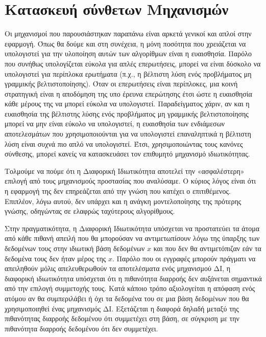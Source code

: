 
\section{Κατασκευή σύνθετων Μηχανισμών}

Οι μηχανισμοί που παρουσιάστηκαν παραπάνω είναι αρκετά γενικοί και απλοί στην εφαρμογή. Όπως θα δούμε και στη συνέχεια, η μόνη ποσότητα που χρειάζεται να υπολογιστεί για την υλοποίηση αυτών των αλγορίθμων είναι η ευαισθησία. Παρόλο που συνήθως υπολογίζεται εύκολα για απλές επερωτήσεις, μπορεί να είναι δύσκολο να υπολογιστεί για περίπλοκα ερωτήματα (π.χ., η βέλτιστη λύση ενός προβλήματος μη γραμμικής βελτιστοποίησης). Όταν οι επερωτήσεις είναι περίπλοκες, μια κοινή στρατηγική είναι η αποδόμηση της υπο έρευνα επερώτησης έτσι ώστε η ευαισθησία κάθε μέρους της να μπορεί εύκολα να υπολογιστεί.
Παραδείγματος χάριν, αν και η ευαισθησία της βέλτιστης λύσης ενός προβλήματος μη γραμμικής βελτιστοποίησης μπορεί να μην είναι εύκολο να υπολογιστεί, η ευαισθησία των ενδιάμεσων αποτελεσμάτων που χρησιμοποιούνται για να υπολογιστεί επαναληπτικά η βέλτιστη λύση είναι συχνά πιο απλό να υπολογιστεί. Έτσι, χρησιμοποιώντας τους κανόνες σύνθεσης, μπορεί κανείς να κατασκευάσει τον επιθυμητό μηχανισμό ιδιωτικότητας.


Τολμούμε να πούμε ότι η Διαφορική Ιδιωτικότητα αποτελεί την «ασφαλέστερη» επιλογή από τους μηχανισμούς προστασίας που αναλύσαμε. Ο κύριος λόγος είναι ότι η εφαρμογή της δεν επηρεάζεται από την γνώση που κατέχει ο επιτιθέμενος. Επιπλέον, λόγω αυτού, δεν υπάρχει και η ανάγκη μοντελοποίησης της πρότερης γνώσης, οδηγώντας σε ελαφρώς ταχύτερους αλγορίθμους. 


Στην πραγματικότητα, η Διαφορική Ιδιωτικότητα υπόσχεται να προστατεύει τα άτομα από κάθε πιθανή απειλή που θα μπορούσαν να αντιμετωπίσουν λόγω της ύπαρξης των δεδομένων τους στην ιδιωτική βάση δεδομένων $x$ και που δεν θα αντιμετόπιζαν εάν τα δεδομένα τους δεν ήταν μέρος της $x$. Παρόλο που οι εγγραφές μπορούν πράγματι να απειληθούν μόλις απελευθερωθούν τα αποτελέσματα ενός μηχανισμού ΔΙ, η διαφορική ιδιωτικότητα υπόσχεται ότι η πιθανότητα διαρροής δεν αυξάνεται σημαντικά από την επιλογή συμμετοχής τους.
Κατά κάποιο τρόπο αξιολογείται η απόφαση ενός ατόμου αν θα συμπεριλάβει ή όχι τα δεδομένα του σε μια βάση δεδομένων που θα χρησιμοποιηθεί ένας μηχανισμός ΔΙ. Εξετάζεται η διαφορά δηλαδή μεταξύ
της πιθανότητας διαρροής δεδομένου ότι συμμετέχει στη βάση, σε σύγκριση με την πιθανότητα διαρροής δεδομένου ότι δεν συμμετέχει.




